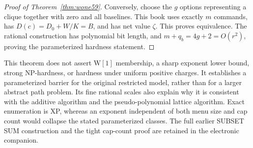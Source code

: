 \begin{proof}[Proof of Theorem~\ref{thm:wone59}]
Conversely, choose the $g$ options representing a clique together with zero and all baselines. This book uses exactly $m$ commands, has $D(c)=D_0+W/K=B$, and has net value $\zeta$. This proves equivalence. The rational construction has polynomial bit length, and $m+q_b=4g+2=O(r^2)$, proving the parameterized hardness statement.
\end{proof}

This theorem does not assert $\mathrm{W}[1]$ membership, a sharp exponent lower bound, strong NP-hardness, or hardness under uniform positive charges. It establishes a parameterized barrier for the original restricted model, rather than for a larger abstract path problem. Its fine rational scales also explain why it is consistent with the additive algorithm and the pseudo-polynomial lattice algorithm. Exact enumeration is XP, whereas an exponent independent of both menu size and cap count would collapse the stated parameterized classes. The full earlier SUBSET SUM construction and the tight cap-count proof are retained in the electronic companion.
